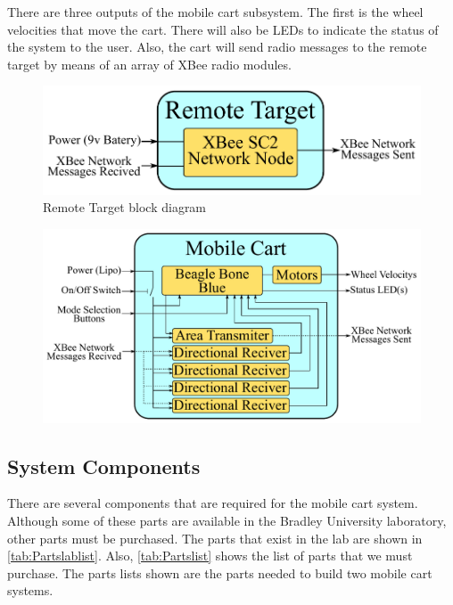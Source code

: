 \documentclass[letterpaper,12pt]{article}   %
\begin{document}
\vspace*{12pt}
\noindent

There are three outputs of the mobile cart subsystem. The first is the wheel
velocities that move the cart. There will also be LEDs to indicate the status of
the system to the user. Also, the cart will send radio messages to the remote
target by means of an array of XBee radio modules. %
%
\begin{figure}[h!]
  \centering
  \includegraphics[scale=0.9]{figs/remote_target_block_diagram}
  \caption{Remote Target block diagram}
  \label{fig:remote_block_diag}
\end{figure}

\begin{figure}[h!]
  \centering
  \includegraphics[scale=0.82]{figs/mobile_cart_block_diagram}
  \caption{}
  \label{fig:mobile_block_diag}
\end{figure}

\subsection{System Components}
There are several components that are required for the mobile cart system. Although some of these parts are available in the Bradley University laboratory, other parts must be purchased. The parts that exist in the lab are shown in \autoref{tab:Partslablist}. Also, \autoref{tab:Partslist} shows the list of parts that we must purchase. The parts lists shown are the parts needed to build two mobile cart systems.
\end{document}

